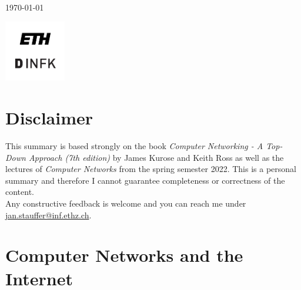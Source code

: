 \begin{titlepage}
	{\large \today} %
	
	
	\vfill\vfill
	\includegraphics[width=0.2\textwidth]{eth-logo.png}\\[1cm] %
	 
	
	\vfill %
	
\end{titlepage}


\section*{Disclaimer}
This summary is based strongly on the book \textit{Computer Networking - A Top-Down Approach (7th edition)} by James Kurose and Keith Ross as well as the 
lectures of \textit{Computer Networks} from the spring semester 2022. This is a personal summary and therefore I cannot guarantee completeness or correctness of the content.\\
Any constructive feedback is welcome and you can reach me under \href{mailto:jan.stauffer@inf.ethz.ch}{jan.stauffer@inf.ethz.ch}.
\newpage

\tableofcontents
\newpage

\section{Computer Networks and the Internet}
